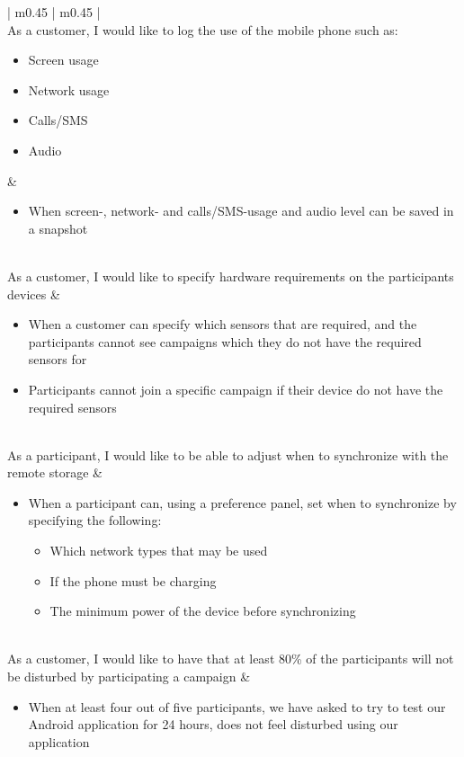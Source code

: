 \begin{center}
\begin{longtable}{| m{} | m{} |}
	 \\ \hline
	As a customer, I would like to log the use of the mobile phone such as:
	\begin{itemize}[noitemsep,topsep=0pt,parsep=0pt,partopsep=0pt]
		\item Screen usage 
		\item Network usage 
		\item Calls/SMS
		\item Audio
	\end{itemize} & 
	\begin{itemize}
		\item When screen-, network- and calls/SMS-usage and audio level can be saved in a snapshot
	\end{itemize} \\ \hline
	As a customer, I would like to specify hardware requirements on the participants devices &
	\begin{itemize}[noitemsep,topsep=0pt,parsep=0pt,partopsep=0pt]
		\item When a customer can specify which sensors that are required, and the participants cannot see campaigns which they do not have the required sensors for
		\item Participants cannot join a specific campaign if their device do not have the required sensors
	\end{itemize} \\ \hline
	As a participant, I would like to be able to adjust when to synchronize with the remote storage &
	\begin{itemize}[noitemsep,topsep=0pt,parsep=0pt,partopsep=0pt]
	 	\item When a participant can, using a preference panel, set when to synchronize by specifying the following:
	 	\begin{itemize}[noitemsep,topsep=0pt,parsep=0pt,partopsep=0pt]
	 		\item Which network types that may be used
	 		\item If the phone must be charging
	 		\item The minimum power of the device before synchronizing
	 	\end{itemize}
	 \end{itemize} \\ \hline
	 As a customer, I would like to have that at least 80\% of the participants will not be disturbed by participating a campaign &
	 \begin{itemize}
	 	\item When at least four out of five participants, we have asked to try to test our Android application for 24 hours, does not feel disturbed using our application

\end{itemize}
\end{longtable}
\end{center}
